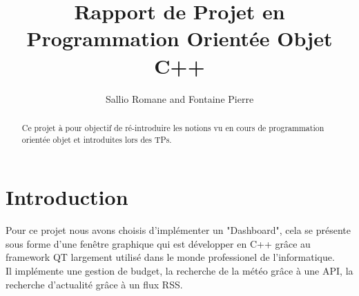 \documentclass[12pt]{report}
\title{Rapport de Projet en Programmation Orientée Objet C++}
\author{Sallio Romane and Fontaine Pierre}
\begin{document}
  \maketitle
  \newpage
  \tableofcontents
  \begin{abstract}
    Ce projet à pour objectif de ré-introduire les notions vu en cours de programmation orientée objet et introduites lors des TPs.
  \end{abstract}
  \newpage
  \part{Introduction}
    Pour ce projet nous avons choisis d'implémenter un "Dashboard", cela se présente sous forme d'une fenêtre graphique qui est développer en C++ grâce au framework QT largement utilisé dans le monde professionel de l'informatique.\\
    Il implémente une gestion de budget, la recherche de la météo grâce à une API, la recherche d'actualité grâce à un flux RSS.
\end{document}
